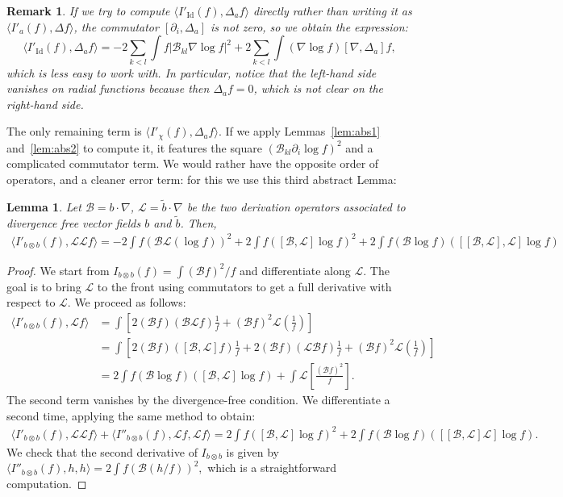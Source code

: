 \documentclass[11pt,a4paper]{article}
\theoremstyle{definition}
\theoremstyle{plain}
\newtheorem{lemma}[defi]{Lemma}
\newtheorem{remark}[defi]{Remark}
\DeclareMathOperator*{\Id}{Id}
\newcommand{\jap}[1]{\langle #1 \rangle}
\begin{document}
\begin{remark}
    If we try to compute $\jap{I'_{\Id}(f),\Delta_a f}$ directly rather than writing it as $\jap{I'_a(f),\Delta f}$, the commutator $[\partial_i,\Delta_a]$ is not zero, so we obtain the expression:
    $$\jap{I'_{\Id}(f),\Delta_a f}=-2\sum_{k<l}\int f \vert \mathcal{B}_{kl} \nabla \log f\vert^2+2\sum_{k<l}\int(\nabla\log f)[\nabla,\Delta_a]f,$$
    which is less easy to work with. In particular, notice that the left-hand side vanishes on radial functions because then $\Delta_a f=0$, which is not clear on the right-hand side.
\end{remark}
The only remaining term is $\jap{I'_\chi(f),\Delta_a f}$. If we apply Lemmas~\ref{lem:abs1} and~\ref{lem:abs2} to compute it, it features the square $(\mathcal{B}_{kl} \partial_i \log f)^2$ and a complicated commutator term. We would rather have the opposite order of operators, and a cleaner error term: for this we use this third abstract Lemma:
\begin{lemma}
\label{lem:abs3}
    Let $\mathcal{B}=b\cdot\nabla$, $\mathcal{L}=\tilde{b}\cdot\nabla$ be the two derivation operators associated to divergence free vector fields $b$ and $\tilde{b}$. Then,
    \begin{align*}
        \jap{I'_{b\otimes b}(f),\mathcal{L}\mathcal{L}f}=-2\int f (\mathcal{B}\mathcal{L}(\log f))^2 + 2\int f ([\mathcal{B},\mathcal{L}]\log f)^2 +2\int f(\mathcal{B}\log f)([[\mathcal{B},\mathcal{L}],\mathcal{L}]\log f)
    \end{align*}
\end{lemma}
\begin{proof}
    We start from $I_{b\otimes b}(f)=\int (\mathcal{B}f)^2/f$ and differentiate along $\mathcal{L}$. The goal is to bring $\mathcal{L}$ to the front using commutators to get a full derivative with respect to $\mathcal{L}$. We proceed as follows:
    \begin{align*}
        \jap{I'_{b\otimes b}(f),\mathcal{L}f}&= \int \left[ 2(\mathcal{B} f) (\mathcal{B} \mathcal{L}f)\frac{1}{f}+(\mathcal{B}f)^2\mathcal{L}\left(\frac{1}{f}\right)\right]\\
        &=\int \left[ 2(\mathcal{B} f) ([\mathcal{B} ,\mathcal{L}]f)\frac{1}{f}+2(\mathcal{B} f) (\mathcal{L}\mathcal{B}f)\frac{1}{f}+(\mathcal{B}f)^2\mathcal{L}\left(\frac{1}{f}\right)\right]\\
        &=2\int f (\mathcal{B} \log f) ([\mathcal{B} ,\mathcal{L}]\log f) + \int\mathcal{L} \left[\frac{(\mathcal{B}f)^2}{f}\right].
    \end{align*}
    The second term vanishes by the divergence-free condition. We differentiate a second time, applying the same method to obtain:
    \begin{align*}
        \jap{I'_{b\otimes b}(f),\mathcal{L}\mathcal{L}f}+\jap{I''_{b\otimes b}(f),\mathcal{L}f,\mathcal{L} f}=2\int f  ([\mathcal{B} ,\mathcal{L}]\log f)^2+2\int f (\mathcal{B} \log f) ([[\mathcal{B} ,\mathcal{L}]\mathcal{L}]\log f).
    \end{align*}
    We check that the second derivative of $I_{b\otimes b}$ is given by $\jap{I''_{b\otimes b}(f),h,h}=2\int f (\mathcal{B}(h/f))^2,$ which is a straightforward computation.
\end{proof}
\end{document}
